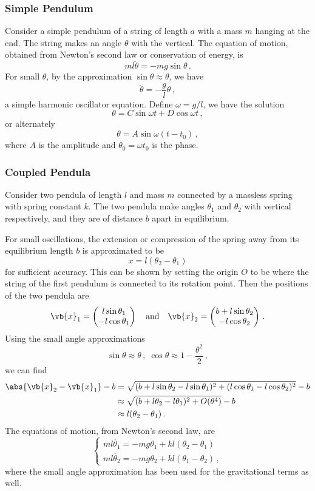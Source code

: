 \documentclass{article}
\theoremstyle{plain}\theoremheaderfont{\normalfont\itshape}\theorembodyfont{\rmfamily}\theoremseparator{.}\newtheorem*{rem}{Remark}\newtheorem*{ex}{Example}\newtheorem*{proof}{Proof}\newtheorem*{altp}{Alternative proof}
\theoremstyle{plain}\theoremheaderfont{\normalfont\bfseries}\theorembodyfont{\rmfamily}\theoremseparator{.}\newtheorem{thm}{Theorem}[section]\newtheorem{lem}[thm]{Lemma}\newtheorem{prop}[thm]{Proposition}\newtheorem*{cor}{Corollary}\newtheorem{defn}[thm]{Definition}\newtheorem{clm}[thm]{Claim}\newtheorem{clminproof}{Claim}
\theoremstyle{break}\theoremheaderfont{\normalfont\itshape}\theorembodyfont{\rmfamily}\theoremseparator{.\medskip}\newtheorem*{proofskip}{Proof}\newtheorem*{exs}{Examples}\newtheorem*{rems}{Remarks}
\theoremstyle{break}\theoremheaderfont{\normalfont\bfseries}\theorembodyfont{\rmfamily}\theoremseparator{.\medskip}\newtheorem{lemskip}[thm]{Lemma}\newtheorem{defnskip}[thm]{Definition}\newtheorem{propskip}[thm]{Proposition}\newtheorem{thmskip}[thm]{Theorem}
\numberwithin{equation}{section}
\begin{document}
	\subsubsection{Simple Pendulum}
	Consider a simple pendulum of a string of length \(a\) with a mass \(m\) hanging at the end. The string makes an angle \(\theta\) with the vertical. The equation of motion, obtained from Newton's second law or conservation of energy, is
	\[ml\ddot{\theta}=-mg\sin\theta\,.\]
	For small \(\theta\), by the approximation \(\sin\theta\approx\theta\), we have
	\[\ddot{\theta}=-\frac{g}{l}\theta\,,\]
	a simple harmonic oscillator equation. Define \(\omega=g/l\), we have the solution
	\[\theta=C\sin\omega t+D\cos\omega t\,,\]
	or alternately
	\[\theta=A\sin\omega(t-t_0)\,,\]
	where \(A\) is the amplitude and \(\theta_0=\omega t_0\) is the phase.
	\subsubsection{Coupled Pendula}
	Consider two pendula of length \(l\) and mass \(m\) connected by a massless spring with spring constant \(k\). The two pendula make angles \(\theta_1\) and \(\theta_2\) with vertical respectively, and they are of distance \(b\) apart in equilibrium.

	For small oscillations, the extension or compression of the spring away from its equilibrium length \(b\) is approximated to be
	\[x=l(\theta_2-\theta_1)\]
	for sufficient accuracy. This can be shown by setting the origin \(O\) to be where the string of the first pendulum is connected to its rotation point. Then the positions of the two pendula are
	\[\vb{x}_1=\begin{pmatrix}
		l\sin\theta_1\\
		-l\cos\theta_1
	\end{pmatrix}\quad\text{and}\quad\vb{x}_2=\begin{pmatrix}
		b+l\sin\theta_2\\
		-l\cos\theta_2
	\end{pmatrix}\,.\]
	Using the small angle approximations
	\[\sin\theta\approx\theta\,,\;\cos\theta\approx 1-\frac{\theta^2}{2}\,,\]
	we can find
	\begin{align*}
		\abs{\vb{x}_2-\vb{x}_1}-b&=\sqrt{(b+l\sin\theta_2-l\sin\theta_1)^2+(l\cos\theta_1-l\cos\theta_2)^2}-b\\
		&\approx\sqrt{(b+l\theta_2-l\theta_1)^2+O(\theta^4)}-b\\
		&\approx l(\theta_2-\theta_1)\,.
	\end{align*}
	The equations of motion, from Newton's second law, are
	\[\begin{cases}
		ml\ddot{\theta_1}=-mg\theta_1+kl(\theta_2-\theta_1)\\
		ml\ddot{\theta_2}=-mg\theta_2+kl(\theta_1-\theta_2)\,,
	\end{cases}\]
	where the small angle approximation has been used for the gravitational terms as well.
\end{document}
